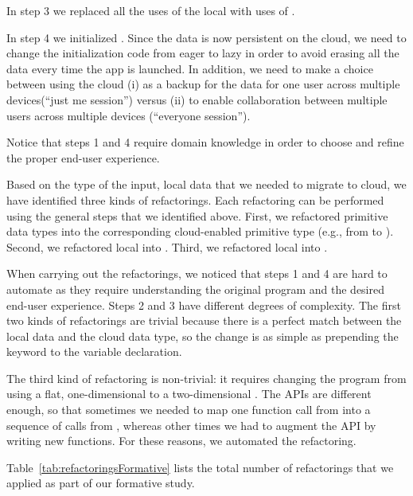 \documentclass{sigplanconf}
\begin{document}
In step 3 we replaced all the uses of the local  with uses of . 

In step 4 we initialized  . 
Since the data is now persistent on the cloud, we need to change the initialization code from 
eager to lazy in order to avoid erasing all the data every time the app is launched.  
In addition, we need to make a choice between using the cloud (i) as a backup for the data for one user across multiple devices(``just me session'') versus (ii) to enable collaboration between multiple users across multiple devices (``everyone session'').

Notice that steps 1 and 4 require domain knowledge in order to choose and refine the proper end-user experience.  
 
Based on the type of the input, local data that we needed to migrate to cloud, we have identified three kinds of refactorings. Each refactoring can be performed using the general steps that we identified above. First, we refactored primitive data 
types into the corresponding cloud-enabled primitive type (e.g., from  to ).
Second, we refactored local  into . Third, we refactored local 
into .

When carrying out the refactorings, we noticed that steps 1 and 4 are hard to automate as they require understanding the original program and the desired end-user experience. Steps 2 and 3 have different degrees of complexity. 
The first two kinds of refactorings  are trivial because there is a perfect match between the local data and the cloud data type, so the change is as simple as prepending the keyword  to the variable declaration. 

The third kind of refactoring is non-trivial: it requires changing the program from using a flat, one-dimensional  to a two-dimensional . The APIs are different enough, so that sometimes we needed to map one function call from  into a sequence of calls from , whereas other times we had to augment the API by writing new functions. 
For these reasons, we automated the refactoring. 

Table~\ref{tab:refactoringsFormative} lists the total number of refactorings that we applied as part of our formative study.
\end{document}
